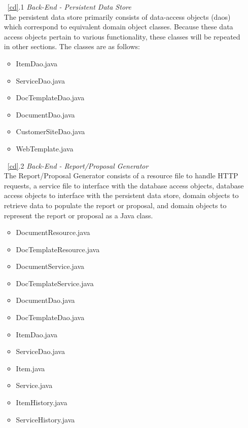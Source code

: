 \documentclass{article}
\newcommand{\br}{\vspace{2mm}}
\begin{document}
\begin{enumerate}
    \item[~\ref{cd}.1 ] \emph{Back-End - Persistent Data Store}\br\\
        The persistent data store primarily consists of data-access objects (daos)
        which correspond to equivalent domain object classes.  Because these data
        access objects pertain to various functionality, these classes will be
        repeated in other sections.  The classes are as follows:
        \begin{itemize}
            \item ItemDao.java
            \item ServiceDao.java
            \item DocTemplateDao.java
            \item DocumentDao.java
            \item CustomerSiteDao.java
            \item WebTemplate.java
        \end{itemize}
    \item[~\ref{cd}.2 ] \emph{Back-End - Report/Proposal Generator}\br\\
        The Report/Proposal Generator consists of a resource file to handle HTTP
        requests, a service file to interface with the database access objects,
        database access objects to interface with the persistent data store,
        domain objects to retrieve data to populate the report or proposal,
        and domain objects to represent the report or proposal as a Java class.
        \begin{itemize}
            \item DocumentResource.java
            \item DocTemplateResource.java
            \item DocumentService.java
            \item DocTemplateService.java
            \item DocumentDao.java
            \item DocTemplateDao.java
            \item ItemDao.java
            \item ServiceDao.java
            \item Item.java
            \item Service.java
            \item ItemHistory.java
            \item ServiceHistory.java

\end{itemize}
\end{enumerate}
\end{document}
